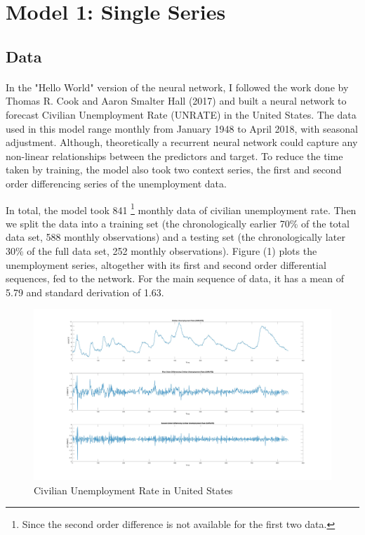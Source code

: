 \documentclass[11pt]{article}
\begin{document}
\section{Model 1: Single Series}
\subsection{Data}
\paragraph{} In the "Hello World" version of the neural network, I followed the work done by Thomas R. Cook and Aaron Smalter Hall (2017) and built a neural network to forecast Civilian Unemployment Rate (UNRATE) in the United States. The data used in this model range monthly from January 1948 to April 2018, with seasonal adjustment. Although, theoretically a recurrent neural network could capture any non-linear relationships between the predictors and target. To reduce the time taken by training, the model also took two context series, the first and second order differencing series of the unemployment data. 

In total, the model took 841
\footnote{Since the second order difference is not available for the first two data.}
monthly data of civilian unemployment rate. Then we split the data into a training set (the chronologically earlier 70\% of the total data set, 588 monthly observations) and a testing set (the chronologically later 30\% of the full data set, 252 monthly observations). Figure (1) plots the unemployment series, altogether with its first and second order differential sequences, fed to the network. For the main sequence of data, it has a mean of 5.79 and standard derivation of 1.63.

\begin{figure}[H]
    \centering
    \includegraphics[width=\linewidth]{unrate_data.jpg}
    \caption{Civilian Unemployment Rate in United States}
\end{figure}
\end{document}
